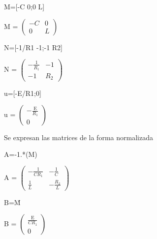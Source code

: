 \documentclass[10pt,a4paper]{article} %
\begin{document}
\begin{matlabcode}
	M=[-C 0;0 L]
\end{matlabcode}
\begin{matlabsymbolicoutput}
	M = 
	$\displaystyle \left(\begin{array}{cc}
	-C & 0\\
	0 & L
	\end{array}\right)$
\end{matlabsymbolicoutput}
\begin{matlabcode}
	N=[-1/R1 -1;-1 R2]
\end{matlabcode}
\begin{matlabsymbolicoutput}
	N = 
	$\displaystyle \left(\begin{array}{cc}
	-\frac{1}{R_1 } & -1\\
	-1 & R_2 
	\end{array}\right)$
\end{matlabsymbolicoutput}
\begin{matlabcode}
	u=[-E/R1;0]
\end{matlabcode}
\begin{matlabsymbolicoutput}
	u = 
	$\displaystyle \left(\begin{array}{c}
	-\frac{\textrm{E}}{R_1 }\\
	0
	\end{array}\right)$
\end{matlabsymbolicoutput}

\begin{par}
	\begin{flushleft}
		Se expresan las matrices de la forma normalizada
	\end{flushleft}
\end{par}

\vspace{1em}

\begin{matlabcode}
	A=-1.*(M\N)
\end{matlabcode}
\begin{matlabsymbolicoutput}
	A = 
	$\displaystyle \left(\begin{array}{cc}
	-\frac{1}{C R_1 } & -\frac{1}{C}\\
	\frac{1}{L} & -\frac{R_2 }{L}
	\end{array}\right)$
\end{matlabsymbolicoutput}
\begin{matlabcode}
	
	B=M\u
\end{matlabcode}
\begin{matlabsymbolicoutput}
	B = 
	$\displaystyle \left(\begin{array}{c}
	\frac{\textrm{E}}{C R_1 }\\
	0
	\end{array}\right)$
\end{matlabsymbolicoutput}
\end{document}
